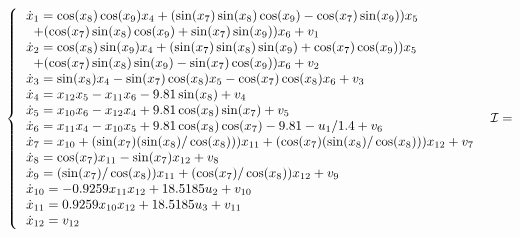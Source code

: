 \begin{figure}
{\small 
\begin{equation}\label{eq:Quad12}
    \hspace{-3mm}\left\{ \hspace{-3mm} \begin{array}{ll}
    &\dot{x}_1 = \cos(x_8) \cos(x_9)x_4+( \sin(x_7) \sin(x_8) \cos(x_9)- \cos(x_7) \sin(x_9))x_5\\
    &\hspace{2mm}+( \cos(x_7) \sin(x_8) \cos(x_9)+ \sin(x_7) \sin(x_9))x_6+v_1\\
    &\dot{x}_2 = \cos(x_8) \sin(x_9)x_4+( \sin(x_7)  \sin(x_8)  \sin(x_9)+ \cos(x_7)  \cos(x_9)) x_5\\
    &\hspace{2mm}+( \cos(x_7)  \sin(x_8)  \sin(x_9)- \sin(x_7)  \cos(x_9)) x_6+v_2\\
    &\dot{x}_3 =  \sin(x_8) x_4- \sin(x_7)  \cos(x_8) x_5- \cos(x_7)  \cos(x_8) x_6+v_3\\
    &\dot{x}_4 = x_{12} x_5-x_{11} x_6-9.81  \sin(x_8)+v_4\\
    &\dot{x}_5 = x_{10} x_6-x_{12} x_4+9.81  \cos(x_8)  \sin(x_7)+v_5\\
    &\dot{x}_6 = x_{11} x_4-x_{10} x_5+9.81  \cos(x_8)  \cos(x_7)-9.81-u_1/1.4+v_6\\
    &\dot{x}_7 = x_{10}+( \sin(x_7) ( \sin(x_8)/ \cos(x_8))) x_{11}+( \cos(x_7) ( \sin(x_8)/ \cos(x_8))) x_{12}+v_7\\
    &\dot{x}_8 =  \cos(x_7) x_{11}- \sin(x_7) x_{12}+v_8\\
    &\dot{x}_9 = ( \sin(x_7)/ \cos(x_8)) x_{11}+( \cos(x_7)/ \cos(x_8)) x_{12}+v_9\\
    &\dot{x}_{10} = -0.9259 x_{11} x_{12}+18.5185 u_2+v_{10}\\
    &\dot{x}_{11} = 0.9259 x_{10} x_{12}+18.5185 u_3+v_{11}\\
    &\dot{x}_{12} = v_{12}
    \end{array}
    \right. 
    \begin{array}{l}
    \init= \\

\end{array}
\end{equation}}
\end{figure}
